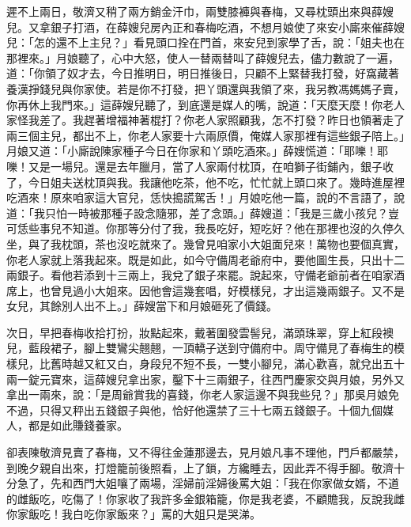 遲不上兩日，敬濟又稍了兩方銷金汗巾，兩雙膝褲與春梅，又尋枕頭出來與薛嫂兒。又拿銀子打酒，在薛嫂兒房內正和春梅吃酒，不想月娘使了來安小廝來催薛嫂兒：「怎的還不上主兒？」看見頭口拴在門首，來安兒到家學了舌，說：「姐夫也在那裡來。」月娘聽了，心中大怒，使人一替兩替叫了薛嫂兒去，儘力數說了一遍，道：「你領了奴才去，今日推明日，明日推後日，只顧不上緊替我打發，好窩藏著養漢掙錢兒與你家使。若是你不打發，把丫頭還與我領了來，我另教馮媽媽子賣，你再休上我門來。」這薛嫂兒聽了，到底還是媒人的嘴，說道：「天麼天麼！你老人家怪我差了。我趕著增福神著棍打？你老人家照顧我，怎不打發？昨日也領著走了兩三個主兒，都出不上，你老人家要十六兩原價，俺媒人家那裡有這些銀子陪上。」月娘又道：「小廝說陳家種子今日在你家和丫頭吃酒來。」薛嫂慌道：「耶嚛！耶嚛！又是一場兒。還是去年臘月，當了人家兩付枕頂，在咱獅子街鋪內，銀子收了，今日姐夫送枕頂與我。我讓他吃茶，他不吃，忙忙就上頭口來了。幾時進屋裡吃酒來！原來咱家這大官兒，恁快搗謊駕舌！」月娘吃他一篇，說的不言語了，說道：「我只怕一時被那種子設念隨邪，差了念頭。」薛嫂道：「我是三歲小孩兒？豈可恁些事兒不知道。你那等分付了我，我長吃好，短吃好？他在那裡也沒的久停久坐，與了我枕頭，茶也沒吃就來了。幾曾見咱家小大姐面兒來！萬物也要個真實，你老人家就上落我起來。既是如此，如今守備周老爺府中，要他圖生長，只出十二兩銀子。看他若添到十三兩上，我兌了銀子來罷。說起來，守備老爺前者在咱家酒席上，也曾見過小大姐來。因他會這幾套唱，好模樣兒，才出這幾兩銀子。又不是女兒，其餘別人出不上。」薛嫂當下和月娘砸死了價錢。

次日，早把春梅收拾打扮，妝點起來，戴著圍發雲髻兒，滿頭珠翠，穿上紅段襖兒，藍段裙子，腳上雙鸞尖翹翹，一頂轎子送到守備府中。周守備見了春梅生的模樣兒，比舊時越又紅又白，身段兒不短不長，一雙小腳兒，滿心歡喜，就兌出五十兩一錠元寶來，這薛嫂兒拿出家，鑿下十三兩銀子，往西門慶家交與月娘，另外又拿出一兩來，說：「是周爺賞我的喜錢，你老人家這邊不與我些兒？」那吳月娘免不過，只得又秤出五錢銀子與他，恰好他還禁了三十七兩五錢銀子。十個九個媒人，都是如此賺錢養家。

卻表陳敬濟見賣了春梅，又不得往金蓮那邊去，見月娘凡事不理他，門戶都嚴禁，到晚夕親自出來，打燈籠前後照看，上了鎖，方纔睡去，因此弄不得手腳。敬濟十分急了，先和西門大姐嚷了兩場，淫婦前淫婦後罵大姐：「我在你家做女婿，不道的雌飯吃，吃傷了！你家收了我許多金銀箱籠，你是我老婆，不顧贍我，反說我雌你家飯吃！我白吃你家飯來？」罵的大姐只是哭涕。

